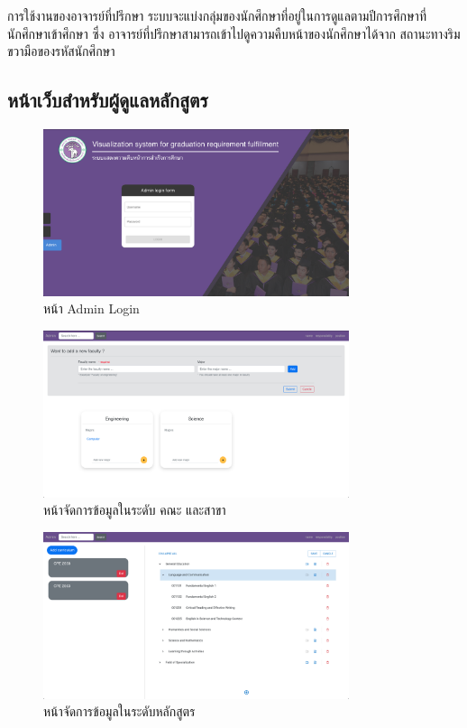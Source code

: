 การใช้งานของอาจารย์ที่ปรึกษา ระบบจะแบ่งกลุ่มของนักศึกษาที่อยู่ในการดูแลตามปีการศึกษาที่นักศึกษาเข้าศึกษา ซึ่ง
อาจารย์ที่ปรึกษาสามารถเข้าไปดูความคืบหน้าของนักศึกษาได้จาก สถานะทางริมขวามือของรหัสนักศึกษา

\subsection{หน้าเว็บสำหรับผู้ดูแลหลักสูตร}

\begin{figure}[H]
  \begin{center}
    \includegraphics[width=0.8\textwidth]{admin_login.png}
    \caption{หน้า Admin Login}
    \label{fig:admin_login}
  \end{center}
\end{figure}

\begin{figure}[H]
  \begin{center}
    \includegraphics[width=0.8\textwidth]{big_admin.png}
    \caption{หน้าจัดการข้อมูลในระดับ คณะ และสาขา}
    \label{fig:big_admin}
  \end{center}
\end{figure}

\begin{figure}[H]
  \begin{center}
    \includegraphics[width=0.8\textwidth]{admin.png}
    \caption{หน้าจัดการข้อมูลในระดับหลักสูตร}
    \label{fig:admin}
  \end{center}
\end{figure}

